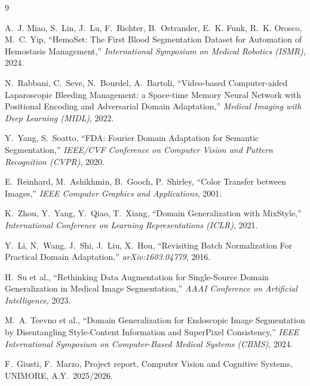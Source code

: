 \documentclass[10pt,conference]{IEEEtran}
\begin{document}
\begin{thebibliography}{9}

 A.~J. Miao, S.~Lin, J.~Lu, F.~Richter, B.~Ostrander, E.~K. Funk, R.~K. Orosco, M.~C. Yip, ``HemoSet: The First Blood Segmentation Dataset for Automation of Hemostasis Management,'' \emph{International Symposium on Medical Robotics (ISMR)}, 2024.

 N.~Rabbani, C.~Seve, N.~Bourdel, A.~Bartoli, ``Video-based Computer-aided Laparoscopic Bleeding Management: a Space-time Memory Neural Network with Positional Encoding and Adversarial Domain Adaptation,'' \emph{Medical Imaging with Deep Learning (MIDL)}, 2022.

 Y.~Yang, S.~Soatto, ``FDA: Fourier Domain Adaptation for Semantic Segmentation,'' \emph{IEEE/CVF Conference on Computer Vision and Pattern Recognition (CVPR)}, 2020.

 E.~Reinhard, M.~Ashikhmin, B.~Gooch, P.~Shirley, ``Color Transfer between Images,'' \emph{IEEE Computer Graphics and Applications}, 2001.

 K.~Zhou, Y.~Yang, Y.~Qiao, T.~Xiang, ``Domain Generalization with MixStyle,'' \emph{International Conference on Learning Representations (ICLR)}, 2021.

 Y.~Li, N.~Wang, J.~Shi, J.~Liu, X.~Hou, ``Revisiting Batch Normalization For Practical Domain Adaptation,'' \emph{arXiv:1603.04779}, 2016.

 H.~Su et al., ``Rethinking Data Augmentation for Single-Source Domain Generalization in Medical Image Segmentation,'' \emph{AAAI Conference on Artificial Intelligence}, 2023.

 M.~A. Teevno et al., ``Domain Generalization for Endoscopic Image Segmentation by Disentangling Style-Content Information and SuperPixel Consistency,'' \emph{IEEE International Symposium on Computer-Based Medical Systems (CBMS)}, 2024.

 F.~Giusti, F.~Marzo, Project report, Computer Vision and Cognitive Systems, UNIMORE, A.Y.~2025/2026.

\end{thebibliography}
\end{document}
